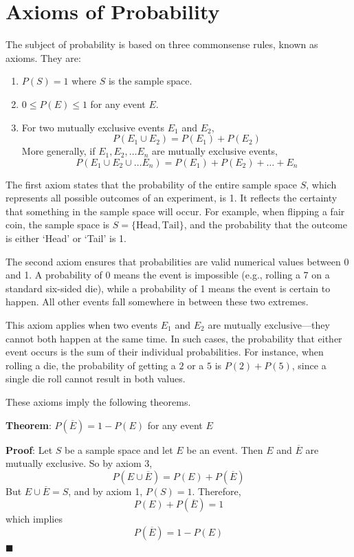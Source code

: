 \documentclass[twoside]{book}
\begin{document}
\section{Axioms of Probability}
The subject of probability is based on three commonsense rules, known as axioms. They are:

\begin{textbox}
    \begin{enumerate}
        \item $P(S) = 1$ where $S$ is the sample space.
        \item $0 \leq P(E) \leq 1$ for any event $E$.
        \item For two mutually exclusive events $E_1$ and $E_2$, $$P(E_1 \cup E_2) = P(E_1) + P(E_2)$$
        More generally, if $E_1, E_2, \dots E_n$ are mutually exclusive events,
        $$P(E_1 \cup E_2 \cup \dots E_n) = P(E_1) + P(E_2) + \dots + E_n$$
    \end{enumerate}
\end{textbox}

The first axiom states that the probability of the entire sample space $S$, which represents all possible outcomes of an experiment, is 1. It reflects the certainty that something in the sample space will occur. For example, when flipping a fair coin, the sample space is $S = \{\text{Head}, \text{Tail}\}$, and the probability that the outcome is either `Head' or `Tail' is 1.

The second axiom ensures that probabilities are valid numerical values between 0 and 1. A probability of 0 means the event is impossible (e.g., rolling a 7 on a standard six-sided die), while a probability of 1 means the event is certain to happen. All other events fall somewhere in between these two extremes.

This axiom applies when two events $E_1$ and $E_2$ are mutually exclusive—they cannot both happen at the same time. In such cases, the probability that either event occurs is the sum of their individual probabilities. For instance, when rolling a die, the probability of getting a $2$ or a $5$ is $P(2)+P(5)$, since a single die roll cannot result in both values.

These axioms imply the following theorems.
\begin{textbox}
\textbf{Theorem}: $P(\overline{E}) = 1 - P(E)$ for any event $E$
\end{textbox}

\textbf{Proof}: Let $S$ be a sample space and let $E$ be an event. Then $E$ and $\overline{E}$ are mutually exclusive. So by axiom 3,
$$P(E \cup \overline{E}) = P(E) + P(\overline{E})$$
But $E \cup \overline{E} = S$, and by axiom 1, $P(S) = 1$. Therefore,
$$P(E) + P(\overline{E}) = 1$$
which implies
$$P(\overline{E}) = 1 - P(E)$$
\hfill\(\blacksquare\)
\end{document}
